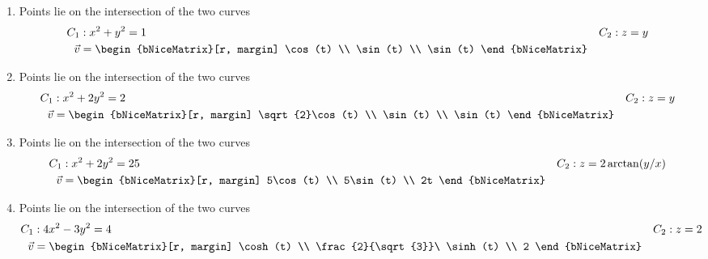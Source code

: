 \begin{enumerate}
    \item Points lie on the intersection of the two curves
          \begin{align}
              C_1     & : x^2 + y^2 = 1                  & C_2 & : z = y \\
              \vec{v} & = \begin{bNiceMatrix}[r, margin]
                              \cos(t) \\ \sin(t) \\ \sin(t)
                          \end{bNiceMatrix}
          \end{align}

    \item Points lie on the intersection of the two curves
          \begin{align}
              C_1     & : x^2 + 2y^2 = 2                      & C_2 & : z = y \\
              \vec{v} & = \begin{bNiceMatrix}[r, margin]
                              \sqrt{2}\cos(t) \\ \sin(t) \\ \sin(t)
                          \end{bNiceMatrix}
          \end{align}

    \item Points lie on the intersection of the two curves
          \begin{align}
              C_1     & : x^2 + 2y^2 = 25                &
              C_2     & : z = 2\arctan(y/x)                \\
              \vec{v} & = \begin{bNiceMatrix}[r, margin]
                              5\cos(t) \\ 5\sin(t) \\ 2t
                          \end{bNiceMatrix}
          \end{align}

    \item Points lie on the intersection of the two curves
          \begin{align}
              C_1     & : 4x^2 - 3y^2 = 4                                            &
              C_2     & : z = 2                                                        \\
              \vec{v} & = \begin{bNiceMatrix}[r, margin]
                              \cosh(t) \\ \frac{2}{\sqrt{3}}\ \sinh(t) \\ 2
                          \end{bNiceMatrix}
          \end{align}


\end{enumerate}
